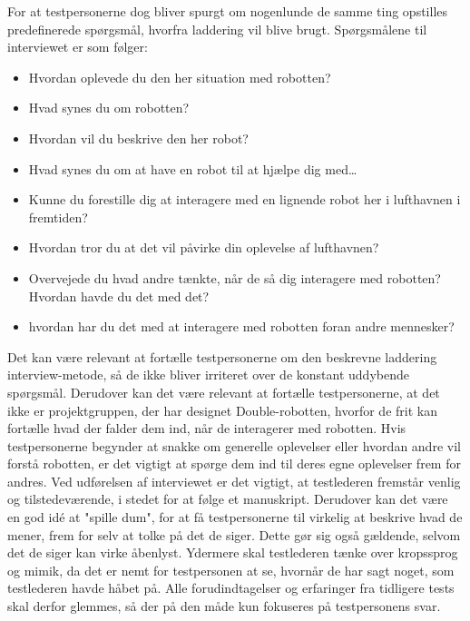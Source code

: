 For at testpersonerne dog bliver spurgt om nogenlunde de samme ting opstilles predefinerede spørgsmål, hvorfra laddering vil blive brugt. Spørgsmålene til interviewet er som følger:\blankline
\begin{itemize}
	\item Hvordan oplevede du den her situation med robotten?
	\item Hvad synes du om robotten?
	\item Hvordan vil du beskrive den her robot?
	\item Hvad synes du om at have en robot til at hjælpe dig med…
	\item Kunne du forestille dig at interagere med en lignende robot her i lufthavnen i fremtiden?
	\item Hvordan tror du at det vil påvirke din oplevelse af lufthavnen?
	\item Overvejede du hvad andre tænkte, når de så dig interagere med robotten? Hvordan havde du det med det?
	\item hvordan har du det med at interagere med robotten foran andre mennesker?\blankline
\end{itemize}
%

Det kan være relevant at fortælle testpersonerne om den beskrevne laddering interview-metode, så de ikke bliver irriteret over de konstant uddybende spørgsmål. Derudover kan det være relevant at fortælle testpersonerne, at det ikke er projektgruppen, der har designet Double-robotten, hvorfor de frit kan fortælle hvad der falder dem ind, når de interagerer med robotten. Hvis testpersonerne begynder at snakke om generelle oplevelser eller hvordan andre vil forstå robotten, er det vigtigt at spørge dem ind til deres egne oplevelser frem for andres. \blankline
%
Ved udførelsen af interviewet er det vigtigt, at testlederen fremstår venlig og tilstedeværende, i stedet for at følge et manuskript. Derudover kan det være en god idé at "spille dum", for at få testpersonerne til virkelig at beskrive hvad de mener, frem for selv at tolke på det de siger. Dette gør sig også gældende, selvom det de siger kan virke åbenlyst. Ydermere skal testlederen tænke over kropssprog og mimik, da det er nemt for testpersonen at se, hvornår de har sagt noget, som testlederen havde håbet på. Alle forudindtagelser og erfaringer fra tidligere tests skal derfor glemmes, så der på den måde kun fokuseres på testpersonens svar. 
